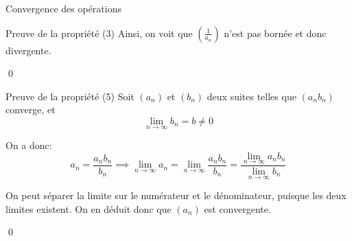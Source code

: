 \documentclass[a4paper]{article}
\begin{document}
\begin{parag}{Convergence des opérations}
\begin{subparag}{Preuve de la propriété (3)}
        Ainsi, on voit que $\left(\frac{1}{a_n}\right)$ n'est pas bornée et donc divergente.

        \qed
    \end{subparag}
    

    \begin{subparag}{Preuve de la propriété (5)}
        Soit $\left(a_n\right)$ et $\left(b_n\right)$ deux suites telles que $\left(a_n b_n\right)$ converge, et 
        \[\lim_{n \to \infty} b_n = b \neq 0\]
        
        On a donc:
        \[a_n = \frac{a_n b_n}{b_n} \implies \lim_{n \to \infty} a_n = \lim_{n \to \infty} \frac{a_n b_n}{b_n} = \frac{\lim\limits_{n \to \infty} a_n b_n}{\lim\limits_{n \to \infty} b_n}\]
        
        On peut séparer la limite sur le numérateur et le dénominateur, puisque les deux limites existent. On en déduit donc que $\left(a_n\right)$ est convergente.

        \qed
    \end{subparag}
\end{parag}
\end{document}
